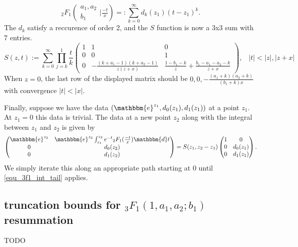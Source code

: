 \documentclass[12pt]{article}
\newcommand{\ee}[0] {\mathbbm{e}}
\newcommand{\dd}[0] {\mathbbm{d}}
\numberwithin{equation}{section}
\newcommand{\FFs}[6] {{}_{#1}{#2}_{#3} ( \begin{smallmatrix} #4 \\ #5 \end{smallmatrix} | {#6}  )}
\begin{document}
\begin{equation*}
\FFs{2}{F}{1}{a_1,a_2}{b_1}{\tfrac{-t}{x}} =: \sum_{k=0}^{\infty} d_k(z_1) (t-z_1)^k\text{.}
\end{equation*}
The $d_k$ satisfy a reccurence of order 2, and the $S$ function is now a 3x3 sum with 7 entries.
\begin{equation*}
S(z,t) := \sum_{k=0}^{\infty} \prod_{j=k}^{1} \frac{t}{k} \begin{pmatrix} 1 & 1 & 0\\ 0 & 0 & 1 \\ 0 & -\frac{(k+a_1-1)(k+a_2-1)}{z (z+x)} & \frac{1-b_1-k}{z}+ \frac{b_1-a_1-a_2-k}{z+x} \end{pmatrix}\text{,} \quad |t| < |z|,|z+x|
\end{equation*}
When $z=0$, the last row of the displayed matrix should be $0,0,-\tfrac{(a_1+k)(a_2+k)}{(b_1+k)x}$ with convergence $|t| < |x|$.

Finally, suppose we have the data $(\ee^{z_1}, d_0(z_1), d_1(z_1))$ at a point $z_1$. At $z_1=0$ this data is trivial. The data at a new point $z_2$ along with the integral between $z_1$ and $z_2$ is given by
\begin{equation*}
\begin{pmatrix}
\ee^{z_2} & \ee^{z_2} \int_{z_1}^{z_2} e^{-t} {}_2 F_1(\tfrac{-t}{x}) \dd t \\
0 & d_0(z_2)\\
0 & d_1(z_2)
\end{pmatrix} = 
S(z_1,z_2-z_1)
\begin{pmatrix}
1 & 0\\
0 & d_0(z_1)\\
0 & d_1(z_1)
\end{pmatrix}\text{.}
\end{equation*}
We simply iterate this along an appropriate path starting at $0$ until \eqref{equ_3f1_int_tail} applies.

\subsection{truncation bounds for ${}_3 F_1(1,a_1,a_2;b_1)$ resummation}
TODO
\end{document}
